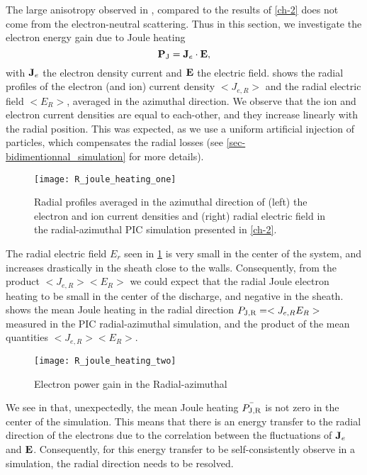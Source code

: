   The large anisotropy observed in , compared to the results of \cref{ch-2} does not come from the electron-neutral scattering.
  Thus in this section, we investigate the electron energy gain due to Joule heating
  \begin{equation} \label{eq-epower}
      {\mathbf P_{\rm J}} = {\mathbf J_e} \cdot {\mathbf E},
  \end{equation}
  with ${\mathbf J_e}$ the electron density current and ${\mathbf E}$ the electric field.
   shows the radial profiles of the electron (and ion) current density $< J_{e, R}>$ and the radial electric field $ < E_R >$, averaged in the azimuthal direction.
  We observe that the ion and electron current densities are equal to each-other, and they increase linearly with the radial position.
  This was expected, as we use a uniform artificial injection of particles, which compensates the radial losses (see \cref{sec-bidimentionnal_simulation} for more details).

  \begin{figure}[hbt]
    \centering
    \texttt{[image: R\_joule\_heating\_one]}
    \caption{Radial profiles averaged in the azimuthal direction of (left) the electron and ion current densities and (right) radial electric field in the radial-azimuthal \ac{PIC} simulation presented in \cref{ch-2}. }
    \label{fig-epower_radialone}
  \end{figure}
  
  The radial electric field $E_r$ seen in \cref{fig-epower_radialone} is very small in the center of the system, and increases drastically in the sheath close to the walls.
  Consequently, from the product $< J_{e, R}>  < E_R >$ we could expect that the radial Joule electron heating to be small in the center of the discharge, and negative in the sheath.
   shows the mean Joule heating in the radial direction ${P_{\rm J, R}} = < J_{e, R} E_R >$ measured in the \ac{PIC} radial-azimuthal simulation, and the product of the mean quantities $< J_{e, R}>  < E_R >$.

  \begin{figure}[hbt]
    \centering
    \texttt{[image: R\_joule\_heating\_two]}
    \caption{Electron power gain in the Radial-azimuthal }
    \label{fig-epower_radial}
  \end{figure}

  We see in  that, unexpectedly,  the mean Joule heating $\bar{P_{\rm J, R}}$ is not zero in the center of the simulation.
  This means that there is an energy transfer to the radial direction of the electrons due to the correlation between the fluctuations of ${\mathbf J_e}$ and ${\mathbf E}$.
  Consequently, for this energy transfer to be self-consistently observe in a simulation, the radial direction needs to be resolved.

